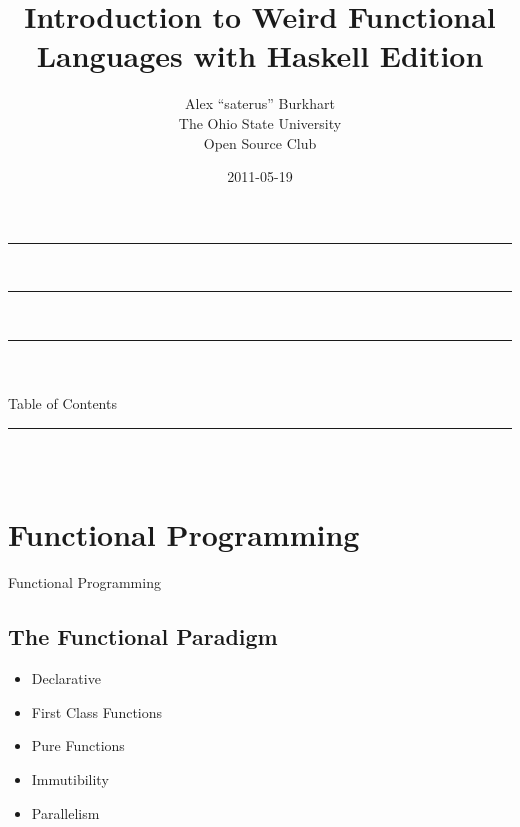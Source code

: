 \documentclass{beamer}                  %
\title{Introduction to Weird Functional Languages with Haskell Edition}    %
\author{
	Alex ``saterus'' Burkhart\\          %
	The Ohio State University\\         %
	Open Source Club                    %
}
\date{2011-05-19}                       %
\newcommand{\srule}{
	\rule{\textwidth}{1pt}\\
}
\newlength{\subsecwidth}
\newenvironment{slide}{
	\begin{frame} %
	\settowidth{\subsecwidth}{\insertsubsection} %
	\ifthenelse{\dimtest{\subsecwidth}{<}{1pt}}{ %
		\frametitle{\insertsection\\             %
		\vspace{-1ex}                            %
		\color{fore}\srule                       %
		\par                                     %
		\vspace{-3ex}                            %
		}
	}{                                           %
		\frametitle{\insertsection\ -- \insertsubsection\\ %
		\vspace{-1ex}                            %
		\color{fore}\srule                       %
		\par                                     %
		\vspace{-3ex}                            %
		}
	}
	\Large                                       %
}{
	\end{frame}
}
\newcommand{\titleslide}[1]{
	\section{#1}             %
	\begin{slide}
		\begin{center}
			\color{comments}
			\Huge            %
			#1               %
		\end{center}
	\end{slide}
}
\begin{document}

\begin{frame}                           %
	\srule                              %
	\titlepage                          %
	\srule                              %
\end{frame}

\begin{frame}                           %
	\begin{center}
		\srule                          %
		\vspace{1ex}
		\color{title} \inserttitle\\\color{fore} Table of Contents
		\srule                          %
	\end{center}
	\begin{columns}                     %
		\begin{column}{.5\textwidth}    %
			\tableofcontents[sections={1-3}] %
		\end{column}
		\begin{column}{.5\textwidth}    %
			\tableofcontents[sections={4-6}] %
		\end{column}
	\end{columns}
\end{frame}


\titleslide{Functional Programming}

\subsection{The Functional Paradigm}
\begin{slide}
  \begin{itemize}
    \item Declarative
    \item First Class Functions
    \item Pure Functions
    \item Immutibility
    \item Parallelism
  \end{itemize}
\end{slide}
\end{document}
